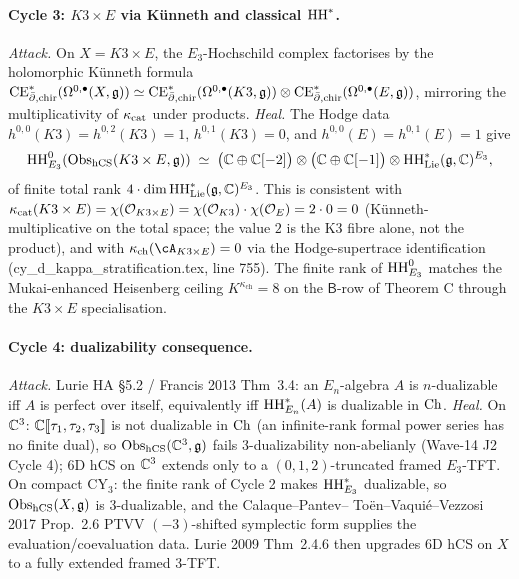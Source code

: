 \paragraph{Cycle 3: $K3\times E$ via K\"unneth and classical $\mathrm{HH}^*$.}
\emph{Attack.} On $X = K3 \times E$, the $E_3$-Hochschild complex
factorises by the holomorphic K\"unneth formula
$\mathrm{CE}^*_{\bar\partial,\mathrm{chir}}(\Omega^{0,\bullet}(X, \mathfrak{g})) \simeq
\mathrm{CE}^*_{\bar\partial,\mathrm{chir}}(\Omega^{0,\bullet}(K3, \mathfrak{g})) \otimes
\mathrm{CE}^*_{\bar\partial,\mathrm{chir}}(\Omega^{0,\bullet}(E, \mathfrak{g}))$, mirroring the
multiplicativity of $\kappa_{\mathrm{cat}}$ under products.
\emph{Heal.} The Hodge data $h^{0,0}(K3) = h^{0,2}(K3) = 1$,
$h^{0,1}(K3) = 0$, and $h^{0,0}(E) = h^{0,1}(E) = 1$ give
\[
  \mathrm{HH}^0_{E_3}(\mathrm{Obs}_{\mathrm{hCS}}(K3 \times E, \mathfrak{g})) \;\simeq\;
  \bigl(\mathbb{C} \oplus \mathbb{C}[-2]\bigr) \otimes \bigl(\mathbb{C} \oplus \mathbb{C}[-1]\bigr) \otimes
  \mathrm{HH}^*_{\mathrm{Lie}}(\mathfrak{g}, \mathbb{C})^{E_3},
\]
of finite total rank $4 \cdot \dim \mathrm{HH}^*_{\mathrm{Lie}}(\mathfrak{g}, \mathbb{C})^{E_3}$.
This is consistent with
$\kappa_{\mathrm{cat}}(K3 \times E) = \chi(\mathcal{O}_{K3 \times E}) = \chi(\mathcal{O}_{K3}) \cdot
\chi(\mathcal{O}_E) = 2 \cdot 0 = 0$ (K\"unneth-multiplicative on the total
space; the value $2$ is the K3 fibre alone, not the product), and
with $\kch(\cA_{K3 \times E}) = 0$ via the Hodge-supertrace
identification (cy\_d\_kappa\_stratification.tex, line 755). The
finite rank of $\mathrm{HH}^0_{E_3}$ matches the Mukai-enhanced Heisenberg
ceiling $K^{\kappa_{\mathrm{ch}}} = 8$ on the $\mathsf B$-row of Theorem C through
the $K3\times E$ specialisation.

\paragraph{Cycle 4: dualizability consequence.}
\emph{Attack.} Lurie HA \S5.2 / Francis 2013 Thm~3.4: an $E_n$-algebra
$A$ is $n$-dualizable iff $A$ is perfect over itself, equivalently iff
$\mathrm{HH}^*_{E_n}(A)$ is dualizable in $\mathrm{Ch}$.
\emph{Heal.} On $\mathbb{C}^3$: $\mathbb{C}[\![\tau_1, \tau_2, \tau_3]\!]$ is not
dualizable in $\mathrm{Ch}$ (an infinite-rank formal power series has no
finite dual), so $\mathrm{Obs}_{\mathrm{hCS}}(\mathbb{C}^3, \mathfrak{g})$ fails 3-dualizability
non-abelianly (Wave-14 J2 Cycle 4); 6D hCS on $\mathbb{C}^3$ extends only
to a $(0,1,2)$-truncated framed $E_3$-TFT. On compact CY$_3$:
the finite rank of Cycle 2 makes $\mathrm{HH}^*_{E_3}$ dualizable, so
$\mathrm{Obs}_{\mathrm{hCS}}(X, \mathfrak{g})$ is 3-dualizable, and the Calaque--Pantev--
Toën--Vaquié--Vezzosi 2017 Prop.~2.6 PTVV $(-3)$-shifted symplectic
form supplies the evaluation/coevaluation data. Lurie 2009 Thm~2.4.6
then upgrades 6D hCS on $X$ to a fully extended framed 3-TFT.

